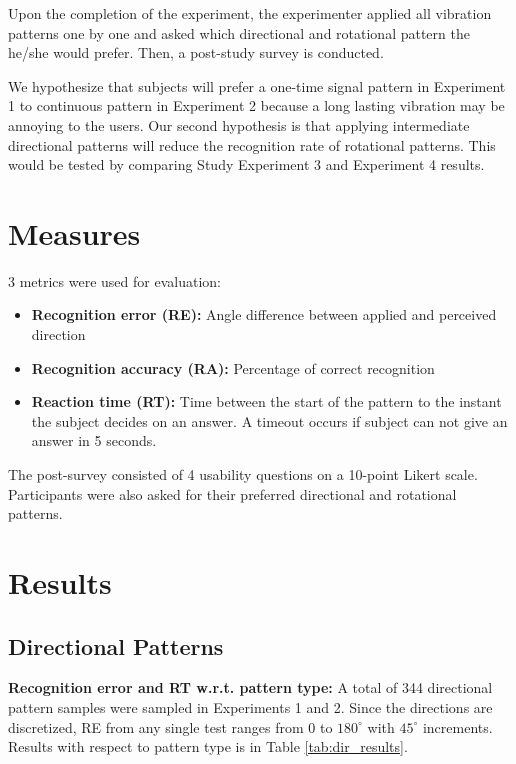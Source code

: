 Upon the completion of the experiment, the experimenter applied all vibration patterns one by one and asked which directional and rotational pattern the he/she would prefer. Then, a post-study survey is conducted.

We hypothesize that subjects will prefer a one-time signal pattern in Experiment 1 to continuous pattern in Experiment 2 because a long lasting vibration may be annoying to the users. Our second hypothesis is that applying intermediate directional patterns will reduce the recognition rate of rotational patterns. This would be tested by comparing Study Experiment 3 and Experiment 4 results.

\section{Measures}

3 metrics were used for evaluation:
\begin{itemize}
\item{\textbf{Recognition error (RE):} Angle difference between applied and perceived direction}
\item{\textbf{Recognition accuracy (RA):} Percentage of correct recognition}
\item{\textbf{Reaction time (RT):}  Time between the start of the pattern to the instant the subject decides on an answer. A timeout occurs if subject can not give an answer in 5 seconds.}
\end{itemize}

The post-survey consisted of 4 usability questions on a 10-point Likert scale. Participants were also asked for their preferred directional and rotational patterns.

\section{Results}
\subsection{Directional Patterns}

\textbf{Recognition error and RT w.r.t. pattern type:} A total of 344 directional pattern samples were sampled in Experiments 1 and 2. Since the directions are discretized, RE from any single test ranges from 0 to $180^{\circ}$ with $45^{\circ}$ increments. Results with respect to pattern type is in Table \ref{tab:dir_results}. 


